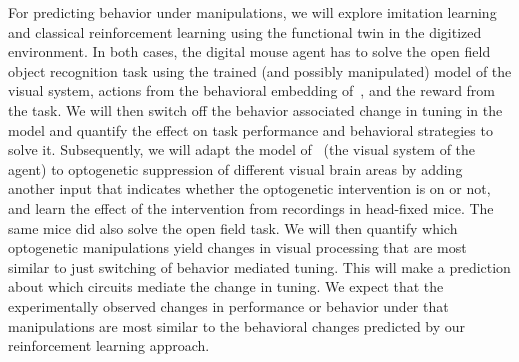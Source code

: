\documentclass[COG,11pt]{ercgrant}
\begin{document}
For predicting behavior under manipulations, we will explore imitation learning~\parencite{Chen2021-ap} and classical reinforcement learning using the functional twin in the digitized environment. 
In both cases, the digital mouse agent has to solve the open field object recognition task using the trained (and possibly manipulated) model of the visual system, actions from the behavioral embedding of~, and the reward from the task. 
We will then switch off the behavior associated change in tuning in the model and quantify the effect on task performance and behavioral strategies to solve it. 
Subsequently, we will adapt the model of~ (the visual system of the agent) to optogenetic suppression of different visual brain areas by adding another input that indicates whether the optogenetic intervention is on or not, and learn the effect of the intervention from recordings in head-fixed mice. 
The same mice did also solve the open field task. 
We will then quantify which optogenetic manipulations yield changes in visual processing that are most similar to just switching of behavior mediated tuning. 
This will make a prediction about which circuits mediate the change in tuning.
We expect that the experimentally observed changes in performance or behavior under that manipulations are most similar to the behavioral changes predicted by our reinforcement learning approach. 

\end{document}
